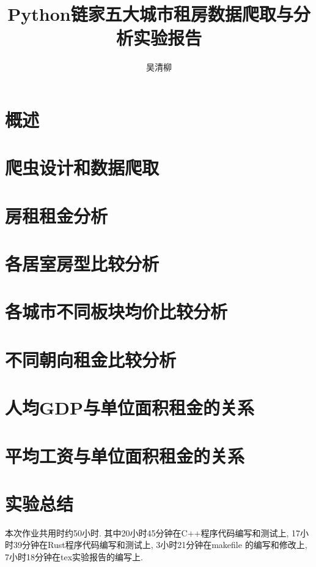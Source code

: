 \documentclass[12pt, twoside]{article}
\title{Python链家五大城市租房数据爬取与分析实验报告}
\author{\textup{吴清柳}}
\begin{document}

\tableofcontents
\newpage

\pagestyle{fancy}
\fancyhead{} %
\fancyfoot{} %
\fancyfoot[CE, CO]{\thepage}


\section{概述}

\section{爬虫设计和数据爬取}

\section{房租租金分析}

\section{各居室房型比较分析}

\section{各城市不同板块均价比较分析}

\section{不同朝向租金比较分析}

\section{人均GDP与单位面积租金的关系}

\section{平均工资与单位面积租金的关系}

\section{实验总结}
本次作业共用时约50小时. 其中20小时45分钟在C++程序代码编写和测试上,
17小时39分钟在Rust程序代码编写和测试上, 3小时21分钟在makefile
的编写和修改上, 7小时18分钟在tex实验报告的编写上.\par
\end{document}
